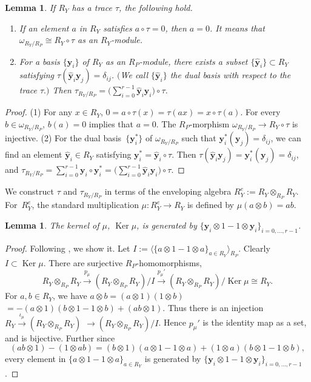 \documentclass[10pt,a4paper]{amsart}
\def\bby{{\mathbf y}}
\def\hby{\widehat {{\mathbf y}}}
\def\Ker{\operatorname{Ker}}
\numberwithin{equation}{section}
\newtheorem{Lemma}[Theorem]{Lemma}
\begin{document}
\begin{Lemma}\label{2lm:trace_1.2}
If $R_Y$ has a trace $\tau$, the following hold.
\begin{enumerate}\itemsep=0pt
\item[$1.$] If an element $a$ in $R_Y$ satisfies $a \circ\tau =0$, then $a=0$.
It means that $\omega_{R_Y/R_P}\cong R_Y\circ \tau$ as an $R_Y$-module.

\item[$2.$] For a basis $\{\bby_i\}$ of $R_Y$ as an $R_P$-module, there exists a subset $\{\hby_i\}\subset R_Y$ satisfying $\tau(\hby_i \bby_j)=\delta_{i j}$.
$($We call $\{\hby_i\}$ the dual basis with respect to the trace $\tau.)$
Then $\tau_{R_Y/R_P}=\big(\sum_{i=0}^{r-1} \hby_i \bby_i\big)\circ \tau$.
\end{enumerate}
\end{Lemma}

\begin{proof}(1) For any $x\in R_Y$, $0=a\circ \tau(x)=\tau(ax)=x\circ \tau(a)$. For every $b \in \omega_{R_Y/R_P}$, $b(a)=0$ implies that $a=0$.
The $R_P$-morphism $\omega_{R_Y/R_P}\to R_Y\circ \tau$ is injective.
(2) For the dual basis~$\{\bby_i^*\}$ of $\omega_{R_Y/R_P}$ such that $\bby_i^*(\bby_j)=\delta_{i j}$, we can find an element $\hby_i\in R_Y$ satisfying $\bby^*_i = \hby_i\circ \tau$.
Then $\tau(\hby_i \bby_j)=\bby_i^*(\bby_j)=\delta_{i j}$, and $\tau_{R_Y/R_P}=\sum_{i=0}^{r-1}\bby_i\circ \bby_i^*=\big(\sum_{i=0}^{r-1} \hby_i \bby_i\big)\circ \tau$.
\end{proof}

We construct $\tau$ and $\tau_{R_Y/R_P}$ in terms of the enveloping algebra
$R_Y^e:=R_Y \otimes_{R_P}R_Y$.
For~$R_Y^e$, the standard multiplication $\mu\colon R_Y^e\to R_Y$ is defined by $\mu(a\otimes b)=ab$.

\begin{Lemma}The kernel of $\mu$, $\Ker \mu$, is generated by $\{\bby_i \otimes 1 - 1 \otimes \bby_i\}_{i=0, \dots, r-1}$.
\end{Lemma}

\begin{proof}
Following \cite[Theorem~G.7]{Kunz2004}, we show it.
Let $I:=\langle \{a \otimes 1 - 1 \otimes a\}_{a\in R_Y}\rangle_{R_P}$.
Clearly $I \subset \Ker \mu$.
There are surjective $R_P$-homomorphisms,
\[
R_Y \otimes_{R_P} R_Y \xrightarrow{p_\mu} (R_Y \otimes_{R_P} R_Y)/I
\xrightarrow{p_\mu'}
(R_Y \otimes_{R_P} R_Y)/\Ker \mu \cong R_Y.
\]
For $a, b \in R_Y$, we have
$a\otimes b=(a\otimes 1)(1\otimes b)$
$=-(a\otimes 1)(b\otimes 1 -1\otimes b)+(ab\otimes 1)$.
Thus there is an injection $R_Y\xrightarrow{\iota_\mu}(R_Y \otimes_{R_P} R_Y)$
$\to (R_Y \otimes_{R_P} R_Y)/I$.
Hence $p_\mu'$ is the identity map as a set, and is bijective.
Further since
\[
(ab\otimes 1)-(1\otimes ab)=
(b\otimes 1)(a\otimes 1 -1\otimes a)+
(1\otimes a)(b\otimes 1 - 1\otimes b),
\]
every element in $\{a \otimes 1 - 1 \otimes a\}_{a\in R_Y}$ is generated by
$\{\bby_i \otimes 1 - 1 \otimes \bby_i\}_{i=0, \dots, r-1}$.
\end{proof}
\end{document}
